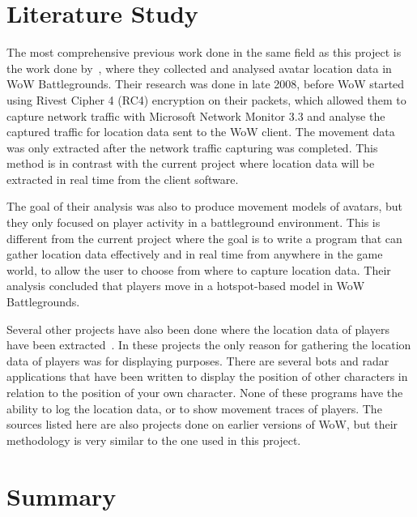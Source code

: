 \section{Literature Study}
The most comprehensive previous work done in the same field as this project is the work done by~\citet{previous}, where they collected and analysed avatar location data in WoW Battlegrounds. Their research was done in late 2008, before WoW started using Rivest Cipher 4 (RC4) encryption on their packets, which allowed them to capture network traffic with Microsoft Network Monitor 3.3 and analyse the captured traffic for location data sent to the WoW client. The movement data was only extracted after the network traffic capturing was completed. This method is in contrast with the current project where location data will be extracted in real time from the client software.

The goal of their analysis was also to produce movement models of avatars, but they only focused on player activity in a battleground environment. This is different from the current project where the goal is to write a program that can gather location data effectively and in real time from anywhere in the game world, to allow the user to choose from where to capture location data. Their analysis concluded that players move in a hotspot-based model in WoW Battlegrounds.


Several other projects have also been done where the location data of players have been extracted~\cite{wradar, wowbot, wowradapp, wowradar}. In these projects the only reason for gathering the location data of players was for displaying purposes.  There are several bots and radar applications that have been written to display the position of other characters in relation to the position of your own character. None of these programs have the ability to log the location data, or to show movement traces of players. The sources listed here are also projects done on earlier versions of WoW, but their methodology is very similar to the one used in this project.


\section{Summary}

